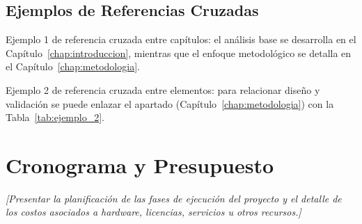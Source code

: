 \subsection{Ejemplos de Referencias Cruzadas}
Ejemplo 1 de referencia cruzada entre capítulos: el análisis base se desarrolla en el Capítulo~\ref{chap:introduccion}, mientras que el enfoque metodológico se detalla en el Capítulo~\ref{chap:metodologia}.

Ejemplo 2 de referencia cruzada entre elementos: para relacionar diseño y validación se puede enlazar el apartado \emph{} (Capítulo~\ref{chap:metodologia}) con la Tabla~\ref{tab:ejemplo_2}.

\section{Cronograma y Presupuesto}
\textit{[Presentar la planificación de las fases de ejecución del proyecto y el detalle de los costos asociados a hardware, licencias, servicios u otros recursos.]}
